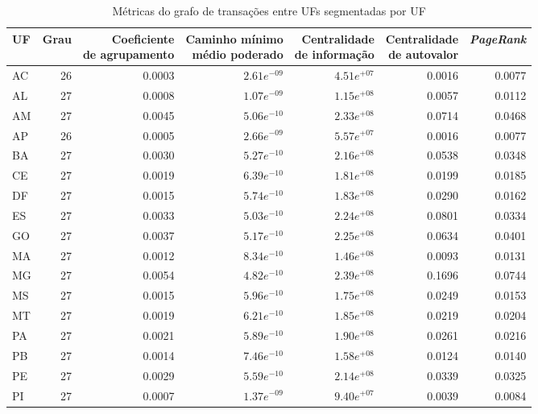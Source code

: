 \begin{table}[htb]
\centering
\caption{Métricas do grafo de transações entre UFs segmentadas por UF}
\label{tab:metricas-redes:grafo-por-uf-especificas1}
    \begin{tabular}{l|rrrrrr}
    \toprule
    UF & Grau & \shortstack{Coeficiente\\de agrupamento} &  \shortstack{Caminho mínimo\\ médio poderado} & \shortstack{Centralidade\\de informação} &  \shortstack{Centralidade\\de autovalor} &  \textit{PageRank} \\
    \midrule
    AC & 26 & 0.0003 & $2.61e^{-09}$ & $4.51e^{+07}$ & 0.0016 & 0.0077 \\
    AL & 27 & 0.0008 & $1.07e^{-09}$ & $1.15e^{+08}$ & 0.0057 & 0.0112 \\
    AM & 27 & 0.0045 & $5.06e^{-10}$ & $2.33e^{+08}$ & 0.0714 & 0.0468 \\
    AP & 26 & 0.0005 & $2.66e^{-09}$ & $5.57e^{+07}$ & 0.0016 & 0.0077 \\
    BA & 27 & 0.0030 & $5.27e^{-10}$ & $2.16e^{+08}$ & 0.0538 & 0.0348 \\
    CE & 27 & 0.0019 & $6.39e^{-10}$ & $1.81e^{+08}$ & 0.0199 & 0.0185 \\
    DF & 27 & 0.0015 & $5.74e^{-10}$ & $1.83e^{+08}$ & 0.0290 & 0.0162 \\
    ES & 27 & 0.0033 & $5.03e^{-10}$ & $2.24e^{+08}$ & 0.0801 & 0.0334 \\
    GO & 27 & 0.0037 & $5.17e^{-10}$ & $2.25e^{+08}$ & 0.0634 & 0.0401 \\
    MA & 27 & 0.0012 & $8.34e^{-10}$ & $1.46e^{+08}$ & 0.0093 & 0.0131 \\
    MG & 27 & 0.0054 & $4.82e^{-10}$ & $2.39e^{+08}$ & 0.1696 & 0.0744 \\
    MS & 27 & 0.0015 & $5.96e^{-10}$ & $1.75e^{+08}$ & 0.0249 & 0.0153 \\
    MT & 27 & 0.0019 & $6.21e^{-10}$ & $1.85e^{+08}$ & 0.0219 & 0.0204 \\
    PA & 27 & 0.0021 & $5.89e^{-10}$ & $1.90e^{+08}$ & 0.0261 & 0.0216 \\
    PB & 27 & 0.0014 & $7.46e^{-10}$ & $1.58e^{+08}$ & 0.0124 & 0.0140 \\
    PE & 27 & 0.0029 & $5.59e^{-10}$ & $2.14e^{+08}$ & 0.0339 & 0.0325 \\
    PI & 27 & 0.0007 & $1.37e^{-09}$ & $9.40e^{+07}$ & 0.0039 & 0.0084 \\

\end{tabular}
\end{table}

